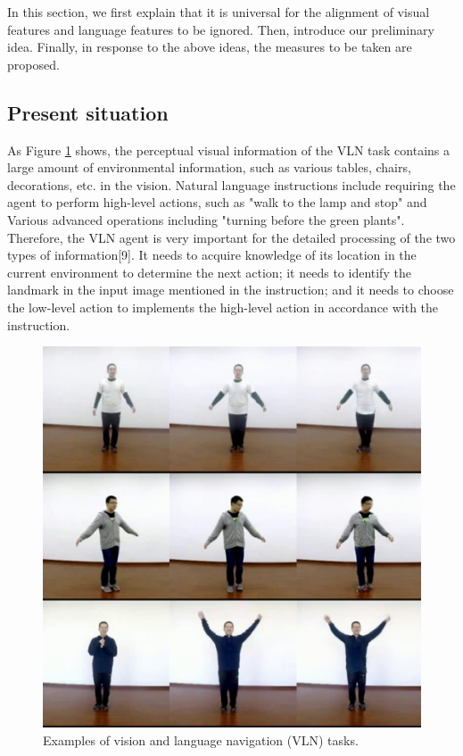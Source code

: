 In this section, we first explain that it is universal for the alignment of visual features and language features to be ignored. Then, introduce our preliminary idea. Finally, in response to the above ideas, the measures to be taken are proposed.

\subsection{Present situation}	

As Figure \ref{image01} shows, the perceptual visual information of the VLN task contains a large amount of environmental information, such as various tables, chairs, decorations, etc. in the vision. Natural language instructions include requiring the agent to perform high-level actions, such as "walk to the lamp and stop" and Various advanced operations including "turning before the green plants". Therefore, the VLN agent is very important for the detailed processing of the two types of information[9]. It needs to acquire knowledge of its location in the current environment to determine the next action; it needs to identify the landmark in the input image mentioned in the instruction; and it needs to choose the low-level action to implements the high-level action in accordance with the instruction.

\begin{figure}
	\centering
	\includegraphics[scale=1]{image01.png}
	\caption{Examples of vision and language navigation (VLN) tasks.}
	\label{image01}
\end{figure}

